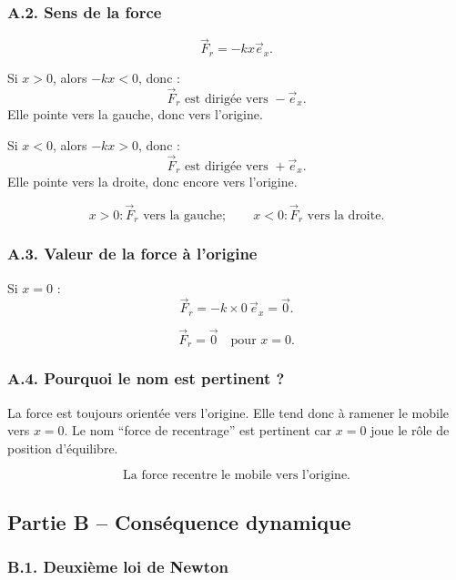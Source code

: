 \documentclass[11pt,a4paper]{article}
\begin{document}
\subsubsection*{A.2. Sens de la force}

\[
\vec F_r=-kx\vec e_x.
\]

Si $x>0$, alors $-kx<0$, donc :
\[
\vec F_r \text{ est dirigée vers } -\vec e_x.
\]
Elle pointe vers la gauche, donc vers l'origine.

Si $x<0$, alors $-kx>0$, donc :
\[
\vec F_r \text{ est dirigée vers } +\vec e_x.
\]
Elle pointe vers la droite, donc encore vers l'origine.

\begin{resultatbox}
\[
\boxed{
x>0 : \vec F_r \text{ vers la gauche};\qquad
x<0 : \vec F_r \text{ vers la droite}.
}
\]
\end{resultatbox}

\subsubsection*{A.3. Valeur de la force à l'origine}

Si $x=0$ :
\[
\vec F_r=-k\times 0\,\vec e_x=\vec 0.
\]

\begin{resultatbox}
\[
\boxed{\vec F_r=\vec 0 \quad \text{pour } x=0.}
\]
\end{resultatbox}

\subsubsection*{A.4. Pourquoi le nom est pertinent ?}

La force est toujours orientée vers l'origine. Elle tend donc à ramener le mobile vers $x=0$.
Le nom ``force de recentrage'' est pertinent car $x=0$ joue le rôle de position d'équilibre.

\begin{resultatbox}
\[
\boxed{\text{La force recentre le mobile vers l'origine.}}
\]
\end{resultatbox}

\subsection{Partie B -- Conséquence dynamique}

\subsubsection*{B.1. Deuxième loi de Newton}
\end{document}
